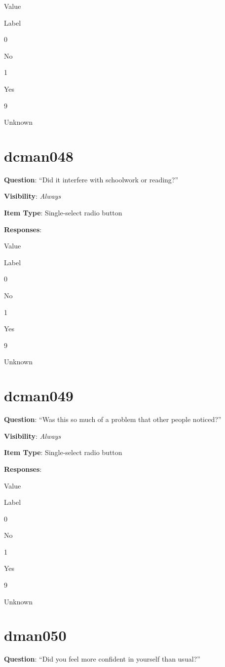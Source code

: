 \documentclass[]{book}
\begin{document}
Value

Label

0

No

1

Yes

9

Unknown

\hypertarget{dcman048}{%
\section{dcman048}\label{dcman048}}

\textbf{Question}: ``Did it interfere with schoolwork or reading?''

\textbf{Visibility}: \emph{Always}

\textbf{Item Type}: Single-select radio button

\textbf{Responses}:

Value

Label

0

No

1

Yes

9

Unknown

\hypertarget{dcman049}{%
\section{dcman049}\label{dcman049}}

\textbf{Question}: ``Was this so much of a problem that other people noticed?''

\textbf{Visibility}: \emph{Always}

\textbf{Item Type}: Single-select radio button

\textbf{Responses}:

Value

Label

0

No

1

Yes

9

Unknown

\hypertarget{dman050}{%
\section{dman050}\label{dman050}}

\textbf{Question}: ``Did you feel more confident in yourself than usual?''
\end{document}
